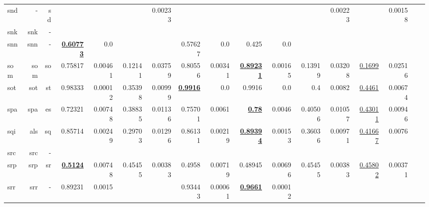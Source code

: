 \documentclass[11pt]{article}
\begin{document}
\begin{table*}[h]
{\begin{tabular}{lrrrrrrrrrrrrrrrr}
snd         & -         & sd         &          &          &          & 0.00233         &          &          &          &          &          & 0.00223         &          & 0.00158         \\
snk         & snk         & -         &          &          &          &          &          &          &          &          &          &          &          &          \\
snn         & snn         & -         & \textbf{\underline{0.60773}}         & 0.0         &          &          & 0.57627         & 0.0         & 0.425         & 0.0         &          &          &          &          \\
som         & som         & so         & 0.75817         & 0.00461         & 0.12141         & 0.03759         & 0.80556         & 0.00341         & \textbf{\underline{0.89231}}         & 0.00165         & 0.13919         & 0.03208         & \underline{0.1699}         & 0.02516         \\
sot         & sot         & st         & 0.98333         & 0.00012         & 0.35398         & 0.00999         & \textbf{\underline{0.9916}}         & 0.0         & 0.9916         & 0.0         & 0.4         & 0.0082         & \underline{0.4461}         & 0.00674         \\
spa         & spa         & es         & 0.72321         & 0.00748         & 0.38835         & 0.01136         & 0.75701         & 0.0061         & \textbf{\underline{0.78}}         & 0.0046         & 0.40506         & 0.01057         & \underline{0.43011}         & 0.00946         \\
sqi         & als         & sq         & 0.85714         & 0.00249         & 0.29703         & 0.01296         & 0.86131         & 0.00219         & \textbf{\underline{0.89394}}         & 0.00153         & 0.36036         & 0.00971         & \underline{0.41667}         & 0.0076         \\
src         & src         & -         &          &          &          &          &          &          &          &          &          &          &          &          \\
srp         & srp         & sr         & \textbf{\underline{0.5124}}         & 0.00748         & 0.45455         & 0.00383         & 0.4958         & 0.00719         & 0.48945         & 0.00696         & 0.45455         & 0.00383         & \underline{0.45802}         & 0.00371         \\
srr         & srr         & -         & 0.89231         & 0.0015         &          &          & 0.93443         & 0.00061         & \textbf{\underline{0.9661}}         & 0.00012         &          &          &          &          \\

\end{tabular}}
\end{table*}
\end{document}
